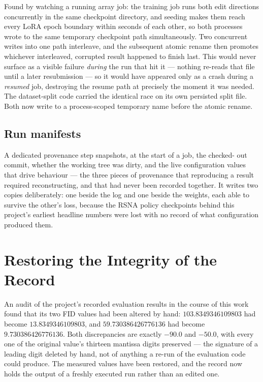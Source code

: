 Found by watching a running array job: the training job runs both edit
directions concurrently in the same checkpoint directory, and seeding
makes them reach every LoRA epoch boundary within seconds of each other,
so both processes wrote to the same temporary checkpoint path
simultaneously. Two concurrent writes into one path interleave, and the
subsequent atomic rename then promotes whichever interleaved, corrupted
result happened to finish last. This would never surface as a visible
failure \emph{during} the run that hit it --- nothing re-reads that file
until a later resubmission --- so it would have appeared only as a crash
during a \emph{resumed} job, destroying the resume path at precisely the
moment it was needed. The dataset-split code carried the identical race
on its own persisted split file. Both now write to a process-scoped
temporary name before the atomic rename.

\subsection{Run manifests}

A dedicated provenance step snapshots, at the start of a job, the checked-
out commit, whether the working tree was dirty, and the live
configuration values that drive behaviour --- the three pieces of
provenance that reproducing a result required reconstructing, and that
had never been recorded together. It writes two copies deliberately: one
beside the log and one beside the weights, each able to survive the
other's loss, because the RSNA policy checkpoints behind this project's
earliest headline numbers were lost with no record of what configuration
produced them.

\section{Restoring the Integrity of the Record}
\label{sec:integrity_record}

An audit of the project's recorded evaluation results in the course of
this work found that its two FID values had been altered by hand:
$103.8349346109803$ had become $13.8349346109803$, and
$59.730386426776136$ had become $9.730386426776136$. Both discrepancies
are exactly $-90.0$ and $-50.0$, with every one of the original value's
thirteen mantissa digits preserved --- the signature of a leading digit
deleted by hand, not of anything a re-run of the evaluation code could
produce. The measured values have been restored, and the record now
holds the output of a freshly executed run rather than an edited one.

